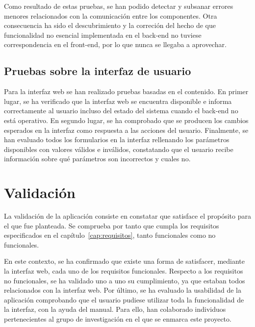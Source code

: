 Como resultado de estas pruebas, se han podido detectar y subsanar errores menores relacionados con la comunicación entre los componentes.
Otra consecuencia ha sido el descubrimiento y la correción del hecho de que funcionalidad no esencial implementada en el \gls{back-end} no tuviese correspondencia en el \gls{front-end}, por lo que nunca se llegaba a aprovechar.

\subsection*{Pruebas sobre la interfaz de usuario\label{ssec:pb:interfaz}}

Para la interfaz web se han realizado pruebas basadas en el contenido.
En primer lugar, se ha verificado que la interfaz web se encuentra disponible e informa correctamente al usuario incluso del estado del sistema cuando el \gls{back-end} no está operativo.
En segundo lugar, se ha comprobado que se producen los cambios esperados en la interfaz como respuesta a las acciones del usuario.
Finalmente, se han evaluado todos los formularios en la interfaz rellenando los parámetros disponibles con valores válidos e inválidos, constatando que el usuario recibe información sobre qué parámetros son incorrectos y cuales no.

\section{Validación\label{sec:pb:validacion}}

La validación de la aplicación consiste en constatar que satisface el propósito para el que fue planteada.
Se comprueba por tanto que cumpla los requisitos especificados en el capítulo~\ref{cap:requisitos}, tanto funcionales como no funcionales.

En este contexto, se ha confirmado que existe una forma de satisfacer, mediante la interfaz web, cada uno de los requisitos funcionales.
Respecto a los requisitos no funcionales, se ha validado uno a uno su cumplimiento, ya que estaban todos relacionados con la interfaz web.
Por último, se ha evaluado la usabilidad de la aplicación comprobando que el usuario pudiese utilizar toda la funcionalidad de la interfaz, con la ayuda del manual.
Para ello, han colaborado individuos pertenecientes al grupo de investigación en el que se enmarca este proyecto.
